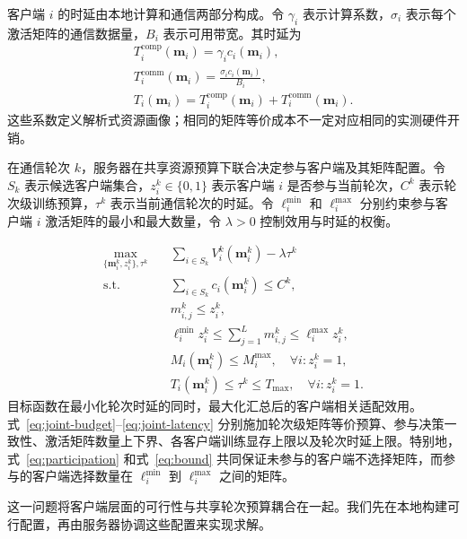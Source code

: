 \documentclass[10pt,conference,letterpaper]{IEEEtran}
\begin{document}
客户端 $i$ 的时延由本地计算和通信两部分构成。令 $\gamma_i$ 表示计算系数，$\sigma_i$ 表示每个激活矩阵的通信数据量，$B_i$ 表示可用带宽。其时延为
\begin{equation}
\begin{aligned}
&&T_i^{\mathrm{comp}}(\mathbf m_i)=\gamma_i c_i(\mathbf m_i),\\
&&T_i^{\mathrm{comm}}(\mathbf m_i)=\frac{\sigma_i c_i(\mathbf m_i)}{B_i},\\
&&T_i(\mathbf m_i)=T_i^{\mathrm{comp}}(\mathbf m_i)+T_i^{\mathrm{comm}}(\mathbf m_i).
\end{aligned}
\label{eq:latency-model}
\end{equation}
这些系数定义解析式资源画像；相同的矩阵等价成本不一定对应相同的实测硬件开销。


在通信轮次 $k$，服务器在共享资源预算下联合决定参与客户端及其矩阵配置。令 $S_k$ 表示候选客户端集合，$z_i^k\in\{0,1\}$ 表示客户端 $i$ 是否参与当前轮次，$C^k$ 表示轮次级训练预算，$\tau^k$ 表示当前通信轮次的时延。令 \(\ell_i^{\min}\) 和 \(\ell_i^{\max}\) 分别约束参与客户端 \(i\) 激活矩阵的最小和最大数量，令 \(\lambda>0\) 控制效用与时延的权衡。

\begin{align}
\max_{\{\mathbf m_i^k,z_i^k\},\tau^k}
\quad&
\sum_{i\in S_k}
V_i^k(\mathbf m_i^k)
-\lambda\tau^k
\label{eq:joint-objective}\\
\text{s.t.}\quad&
\sum_{i\in S_k}
c_i(\mathbf m_i^k)
\leq C^k,
\label{eq:joint-budget}\\
&
m_{i,j}^k\leq z_i^k,
\label{eq:participation}\\
&
\ell_i^{\min}z_i^k
\leq
\sum_{j=1}^{L}m_{i,j}^k
\leq
\ell_i^{\max}z_i^k,
\label{eq:bound}\\
&
M_i(\mathbf m_i^k)
\leq M_i^{\max},
\quad
\forall i:z_i^k=1,
\label{eq:joint-memory}\\
&
T_i(\mathbf m_i^k)
\leq
\tau^k
\leq
T_{\max},
\quad
\forall i:z_i^k=1 .
\label{eq:joint-latency}
\end{align}
目标函数在最小化轮次时延的同时，最大化汇总后的客户端相关适配效用。式~\eqref{eq:joint-budget}--\eqref{eq:joint-latency} 分别施加轮次级矩阵等价预算、参与决策一致性、激活矩阵数量上下界、各客户端训练显存上限以及轮次时延上限。特别地，式~\eqref{eq:participation} 和式~\eqref{eq:bound} 共同保证未参与的客户端不选择矩阵，而参与的客户端选择数量在 \(\ell_i^{\min}\) 到 \(\ell_i^{\max}\) 之间的矩阵。


这一问题将客户端层面的可行性与共享轮次预算耦合在一起。我们先在本地构建可行配置，再由服务器协调这些配置来实现求解。
\end{document}
